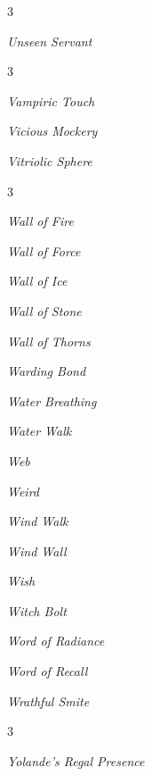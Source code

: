 \documentclass[10pt,a4paper,twoside,bg=print,twocolumn,openany,nodeprecatedcode]{dndbook}
\begin{document}
\begin{description}
\begin{multicols}{3}
\item \textit{Unseen Servant}
\end{multicols}

\end{description}


\begin{description}
\begin{multicols}{3}
\item \textit{Vampiric Touch}
\item \textit{Vicious Mockery}
\item \textit{Vitriolic Sphere}
\end{multicols}

\end{description}


\begin{description}
\begin{multicols}{3}
\item \textit{Wall of Fire}
\item \textit{Wall of Force}
\item \textit{Wall of Ice}
\item \textit{Wall of Stone}
\item \textit{Wall of Thorns}
\item \textit{Warding Bond}
\item \textit{Water Breathing}
\item \textit{Water Walk}
\item \textit{Web}
\item \textit{Weird}
\item \textit{Wind Walk}
\item \textit{Wind Wall}
\item \textit{Wish}
\item \textit{Witch Bolt}
\item \textit{Word of Radiance}
\item \textit{Word of Recall}
\item \textit{Wrathful Smite}
\end{multicols}

\end{description}


\begin{description}
\begin{multicols}{3}
\item \textit{Yolande's Regal Presence}
\end{multicols}

\end{description}
\end{document}
